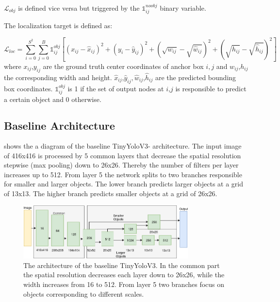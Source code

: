 	$\mathcal{L}_{obj}$ is defined vice versa but triggered by the $\mathbb{1}_{ij}^{noobj}$ binary variable.

	The localization target is defined as:
	
	\begin{equation}
		\mathcal{L}_{loc} = \sum_{i=0}^{S^2}\sum_{j=0}^B \mathbb{1}_{ij}^{obj}[(x_{ij}-\hat{x}_{ij})^2 + (y_i-\hat{y}_{ij})^2  + (\sqrt{w_{ij}}-\sqrt{\hat{w}_{ij}})^2 +(\sqrt{h_{ij}}-\sqrt{\hat{h}_{ij}})^2 ]
	\end{equation}
	where $x_{ij}$,$y_{ij}$ are the ground truth center coordinates of anchor box $i,j$ and $w_{ij}$,$h_{ij}$ the corresponding width and height. $\hat x_{ij}$,$\hat y_{ij}, \hat w_{ij}$,$\hat h_{ij}$ are the predicted bounding box coordinates. $\mathbb{1}_{ij}^{obj}$ is 1 if the set of output nodes at $i$,$j$ is responsible to predict a certain object and 0 otherwise. 
	
	\subsection{Baseline Architecture}
	
	 shows the a diagram of the baseline TinyYoloV3- architecture. The input image of 416x416 is processed by 5 common layers that decrease the spatial resolution stepwise (max pooling) down to 26x26. Thereby the number of filters per layer increases up to 512. From layer 5 the network splits to two branches responsible for smaller and larger objects. The lower branch predicts larger objects at a grid of 13x13. The higher branch predicts smaller objects at a grid of 26x26.
	
	\begin{figure}[hbtp]
			\centering
		\includegraphics[width=0.8\textwidth]{fig/tinyyolov3_arch}
		\caption{The architecture of the baseline TinyYoloV3. In the common part the spatial resolution decreases each layer down to 26x26, while the width increases from 16 to 512. From layer 5 two branches focus on objects corresponding to different scales. }
		\label{fig:tinyyolov3_arch}
	\end{figure}

